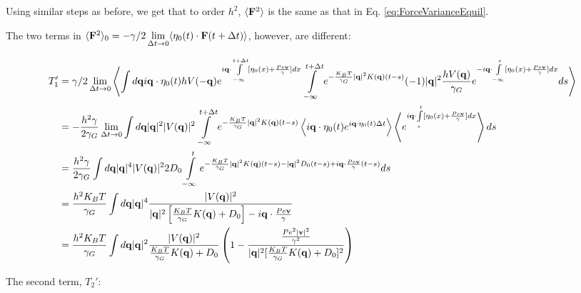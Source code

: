 \documentclass[amsmath,preprintnumbers,10pt,article,notitlepage]{revtex4-1}
\begin{document}
Using similar steps as before, we get that to order $h^2$, $\langle {\bf F}^2 \rangle$ is the same as that in Eq. \ref{eq:ForceVarianceEquil}.


The two terms in $\langle {\bf F}^2 \rangle_0 = -\gamma/2   \displaystyle \lim_{\Delta t \to 0} \langle \eta_0(t) \cdot {\bf F}(t+\Delta t) \rangle$, however, are different:

\begin{align}
T_1' & =  \gamma/2   \lim_{\Delta t \to 0}  \left \langle \int d{\bf q}  i{\bf q} \cdot \eta_0(t)  hV({- \bf q})  e^{i{\bf q} \cdot \int\limits_{-\infty}^{t+\Delta t} [ \eta_0(x) + \frac{Pe{\bf v}}{\gamma}] dx} \int\limits_{-\infty}^{t+\Delta t} e^{-\frac{K_BT}{\gamma_G}|{\bf q}|^2 K({\bf q})(t-s)} (-1) |{\bf q}|^2 \dfrac{h  V({\bf q})}{\gamma_G} e^{-i{\bf q} \cdot \int\limits_{-\infty}^{s} [ \eta_0(x) + \frac{Pe{\bf v}}{\gamma} ] dx}  ds \right \rangle \\
& =  -\frac{h^2 \gamma}{2\gamma_G}   \lim_{\Delta t \to 0} \int d{\bf q}  |{\bf q}|^2 |V({\bf q})|^2   \int\limits_{-\infty}^{t+\Delta t} e^{-\frac{K_BT}{\gamma_G}|{\bf q}|^2 K({\bf q})(t-s)} \left \langle i{\bf q} \cdot \eta_0(t) e^{i{\bf q} \cdot  \eta_0(t) \Delta t} \right \rangle \left \langle e^{i{\bf q} \cdot \int\limits_{s}^{t} [ \eta_0(x) + \frac{Pe{\bf v}}{\gamma} ] dx} \right \rangle ds  \\
& =   \frac{h^2 \gamma}{2\gamma_G}  \int d{\bf q}  |{\bf q}|^4 |V({\bf q})|^2 2D_0  \int\limits_{-\infty}^{t} e^{-\frac{K_BT}{\gamma_G}|{\bf q}|^2 K({\bf q})(t-s) - |{\bf q}|^2 D_0(t-s) + i{\bf q} \cdot \frac{Pe{\bf v}}{\gamma}(t-s)} ds  \\
& = \frac{h^2 K_BT}{\gamma_G} \int d{\bf q} |{\bf q}|^4  \dfrac{ |V({\bf q})|^2}{ |{\bf q}|^2 \left[ \frac{K_BT}{\gamma_G} K({\bf q}) + D_0 \right] - i{\bf q} \cdot \frac{Pe{\bf v}}{\gamma}} \\
& = \frac{h^2 K_BT}{\gamma_G} \int d{\bf q} |{\bf q}|^2  \dfrac{ |V({\bf q})|^2}{ \frac{K_BT}{\gamma_G} K({\bf q}) + D_0} \left( 1- \dfrac{ \frac{Pe^2 |{\bf v}|^2}{\gamma^2}}{|{\bf q}|^2 [\frac{K_BT}{\gamma_G} K({\bf q}) + D_0 ]^2 } \right) \\
\label{eq:NoiseForceT1Driven}
\end{align}

The second term, $T_2'$:
\end{document}

